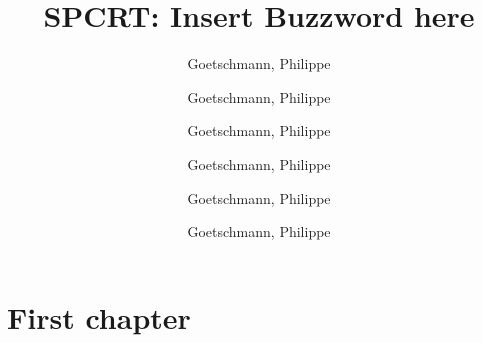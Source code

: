\documentclass{scrartcl}
\title{SPCRT: Insert Buzzword here}
\author{
    Goetschmann, Philippe\\
    \and
    Goetschmann, Philippe\\
    \and
    Goetschmann, Philippe\\
    \and
    Goetschmann, Philippe\\
    \and
    Goetschmann, Philippe\\
    \and
    Goetschmann, Philippe\\
    \and
}
\date{}
\begin{document}
\maketitle

\section{First chapter}
\end{document}
